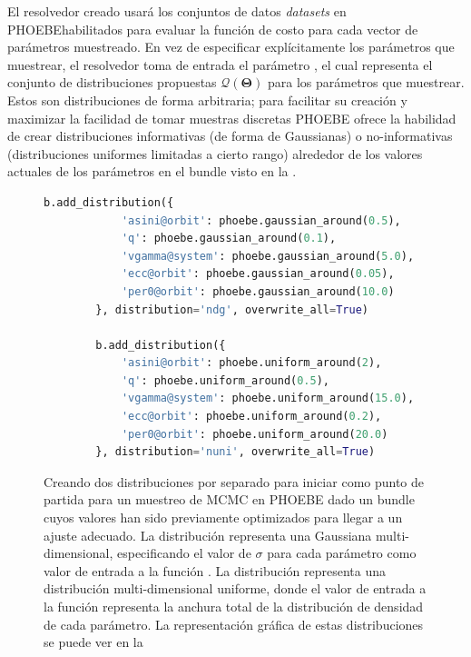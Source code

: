 El resolvedor  creado usará los conjuntos de datos\textemdash
\textit{datasets} en PHOEBE\textemdash habilitados para evaluar la función de
costo para cada vector de parámetros muestreado. En vez de especificar
explícitamente los parámetros que muestrear, el resolvedor toma de entrada el
parámetro , el cual representa el conjunto de distribuciones
propuestas $\mathcal{Q}(\mathbf{\Theta})$ para los parámetros que muestrear.
Estos son distribuciones de forma arbitraria; para facilitar su creación y
maximizar la facilidad de tomar muestras discretas PHOEBE ofrece la habilidad de
crear distribuciones informativas (de forma de Gaussianas) o no-informativas
(distribuciones uniformes limitadas a cierto rango) alrededor de los valores
actuales de los parámetros en el bundle visto en la .

\begin{figure}[!ht]
	\centering
	\begin{lstlisting}[language=Python, autogobble]
		b.add_distribution({
			'asini@orbit': phoebe.gaussian_around(0.5),
			'q': phoebe.gaussian_around(0.1),
			'vgamma@system': phoebe.gaussian_around(5.0),
			'ecc@orbit': phoebe.gaussian_around(0.05),
			'per0@orbit': phoebe.gaussian_around(10.0)
		}, distribution='ndg', overwrite_all=True)

		b.add_distribution({
			'asini@orbit': phoebe.uniform_around(2),
			'q': phoebe.uniform_around(0.5),
			'vgamma@system': phoebe.uniform_around(15.0),
			'ecc@orbit': phoebe.uniform_around(0.2),
			'per0@orbit': phoebe.uniform_around(20.0)
		}, distribution='nuni', overwrite_all=True)
	\end{lstlisting}
	\caption{Creando dos distribuciones por separado para iniciar como punto de
	partida para un muestreo de MCMC en PHOEBE dado un bundle  cuyos
	valores han sido previamente optimizados para llegar a un ajuste adecuado.
	La distribución  representa una Gaussiana multi-dimensional,
	especificando el valor de $\sigma$ para cada parámetro como valor de entrada
	a la función . La distribución 
	representa una distribución multi-dimensional uniforme, donde el valor de
	entrada a la función  representa la anchura
	total de la distribución de densidad de cada parámetro. La representación
	gráfica de estas distribuciones se puede ver en la
	}
	\label{codigoMuestreoPriors}
\end{figure}

